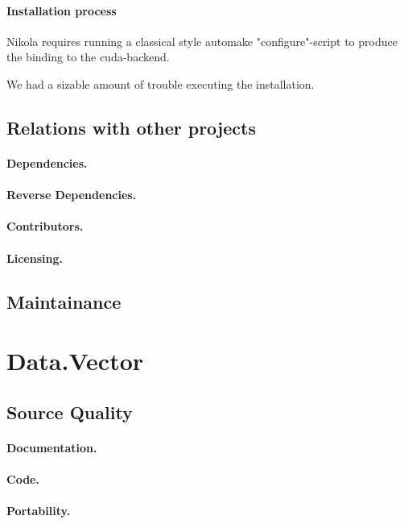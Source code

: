 \paragraph{Installation process} Nikola requires running a classical style
automake "configure"-script to produce the binding to the cuda-backend.

We had a sizable amount of trouble executing the installation. 

\subsection{Relations with other projects}
\paragraph{Dependencies.}
\paragraph{Reverse Dependencies.}
\paragraph{Contributors.}
\paragraph{Licensing.}
\subsection{Maintainance}

\section{Data.Vector}

\subsection{Source Quality}
\paragraph{Documentation.}
\paragraph{Code.}
\paragraph{Portability.}
